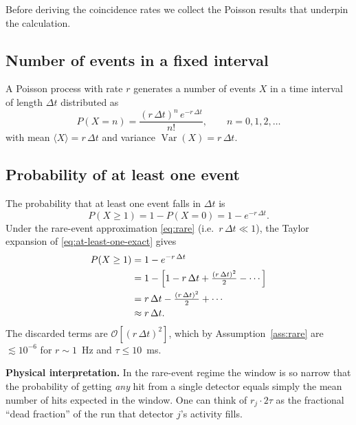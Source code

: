 \documentclass[12pt]{article}
\theoremstyle{definition}
\newcommand{\Prob}[1]{P\!\left(#1\right)}
\begin{document}
Before deriving the coincidence rates we collect the Poisson results
that underpin the calculation.

\subsection{Number of events in a fixed interval}

A Poisson process with rate $r$ generates a number of events $X$ in a
time interval of length $\Delta t$ distributed as
\begin{equation}
    \Prob{X = n} = \frac{(r\,\Delta t)^n\, e^{-r\,\Delta t}}{n!},
    \qquad n = 0, 1, 2, \ldots
    \label{eq:poisson-pmf}
\end{equation}
with mean $\langle X \rangle = r\,\Delta t$ and variance $\operatorname{Var}(X)
= r\,\Delta t$.

\subsection{Probability of at least one event}

The probability that at least one event falls in $\Delta t$ is
\begin{equation}
    \Prob{X \geq 1} = 1 - \Prob{X = 0} = 1 - e^{-r\,\Delta t}.
    \label{eq:at-least-one-exact}
\end{equation}
Under the rare-event approximation \eqref{eq:rare} (i.e.\ $r\,\Delta t \ll 1$),
the Taylor expansion of \eqref{eq:at-least-one-exact} gives
\begin{align}
    \Prob{X \geq 1}
        &= 1 - e^{-r\,\Delta t} \notag \\
        &= 1 - \Bigl[1 - r\,\Delta t + \tfrac{(r\,\Delta t)^2}{2} -
           \cdots\Bigr] \notag \\
        &= r\,\Delta t - \tfrac{(r\,\Delta t)^2}{2} + \cdots \notag \\
        &\approx r\,\Delta t.
    \label{eq:at-least-one-approx}
\end{align}
The discarded terms are $\mathcal{O}\!\left[(r\,\Delta t)^2\right]$, which
by Assumption~\ref{ass:rare} are $\lesssim 10^{-6}$ for $r \sim 1$~Hz
and $\tau \leq 10$~ms.

\textbf{Physical interpretation.} In the rare-event regime the window
is so narrow that the probability of getting \emph{any} hit from a
single detector equals simply the mean number of hits expected in the
window.  One can think of $r_j \cdot 2\tau$ as the fractional ``dead
fraction'' of the run that detector $j$'s activity fills.
\end{document}
